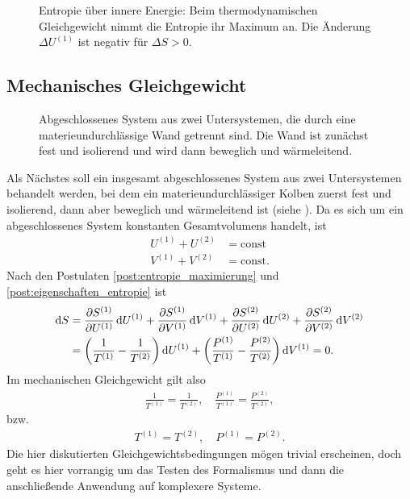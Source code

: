 \begin{figure}[htbp]
    \centering
    \tfigFunktionEntropieMaximum
    \caption{Entropie über innere Energie: Beim thermodynamischen Gleichgewicht nimmt die Entropie ihr Maximum an. Die Änderung $\Delta U^{(1)}$ ist negativ für $\Delta S>0$. }
    \label{fig:FunktionEntropieMaximum}
\end{figure}




\subsection{Mechanisches Gleichgewicht}


\begin{figure}[htbp]
    \centering
    \tfigDoppelsystemUVNbeweglicheWaermeleitendeWand
    \caption{Abgeschlossenes System aus zwei Untersystemen, die durch eine materieundurchlässige Wand getrennt sind. Die Wand ist zunächst fest und isolierend und wird dann beweglich und wärmeleitend.}
    \label{fig:DoppelsystemUVNbeweglicheWaermeleitendeWand}
\end{figure}


Als Nächstes soll ein insgesamt abgeschlossenes System aus zwei Untersystemen behandelt werden, bei dem ein materieundurchlässiger Kolben zuerst fest und isolierend, dann aber beweglich und wärmeleitend ist (siehe ). Da es sich um ein abgeschlossenes System konstanten Gesamtvolumens handelt, ist
\begin{align*}
    U^{(1)} + U^{(2)} & = \mathrm{const}  \\
    V^{(1)} + V^{(2)} & = \mathrm{const}.
\end{align*}
Nach den Postulaten \ref{post:entropie_maximierung} und \ref{post:eigenschaften_entropie} ist
\begin{align*}
    \mathop{}\!\mathrm{d} S & = \frac{\partial S^{(1)}}{\partial U^{(1)}}\mathop{}\!\mathrm{d} U^{(1)} + \frac{\partial S^{(1)}}{\partial V^{(1)}}\mathop{}\!\mathrm{d} V^{(1)}+\frac{\partial S^{(2)}}{\partial U^{(2)}}\mathop{}\!\mathrm{d} U^{(2)} + \frac{\partial S^{(2)}}{\partial V^{(2)}}\mathop{}\!\mathrm{d} V^{(2)} \\
            & = \left(\frac{1}{T^{(1)}}-\frac{1}{T^{(2)}}\right)\mathop{}\!\mathrm{d} U^{(1)} + \left(\frac{P^{(1)}}{T^{(1)}}-\frac{P^{(2)}}{T^{(2)}}\right) \mathop{}\!\mathrm{d} V^{(1)} = 0.
\end{align*}
Im mechanischen Gleichgewicht gilt also
\begin{align*}
    \frac{1}{T^{(1)}} = \frac{1}{T^{(2)}} , \quad \frac{P^{(1)}}{T^{(1)}}=\frac{P^{(2)}}{T^{(2)}},
\end{align*}
bzw.
\begin{align*}
    T^{(1)} = T^{(2)}, \quad P^{(1)} = P^{(2)}.
\end{align*}
Die hier diskutierten Gleichgewichtsbedingungen mögen trivial erscheinen, doch geht es hier vorrangig um das Testen des Formalismus und dann die anschließende Anwendung auf komplexere Systeme.



